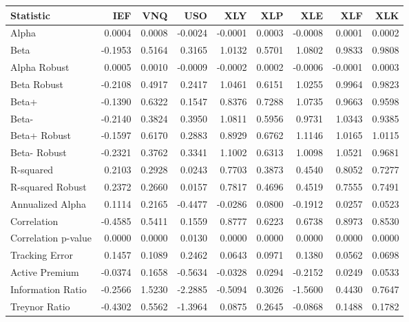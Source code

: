 \begin{tabular}{lrrrrrrrr}
\toprule
Statistic & IEF & VNQ & USO & XLY & XLP & XLE & XLF & XLK \\
\midrule
Alpha & 0.0004 & 0.0008 & -0.0024 & -0.0001 & 0.0003 & -0.0008 & 0.0001 & 0.0002 \\
Beta & -0.1953 & 0.5164 & 0.3165 & 1.0132 & 0.5701 & 1.0802 & 0.9833 & 0.9808 \\
Alpha Robust & 0.0005 & 0.0010 & -0.0009 & -0.0002 & 0.0002 & -0.0006 & -0.0001 & 0.0003 \\
Beta Robust & -0.2108 & 0.4917 & 0.2417 & 1.0461 & 0.6151 & 1.0255 & 0.9964 & 0.9823 \\
Beta+ & -0.1390 & 0.6322 & 0.1547 & 0.8376 & 0.7288 & 1.0735 & 0.9663 & 0.9598 \\
Beta- & -0.2140 & 0.3824 & 0.3950 & 1.0811 & 0.5956 & 0.9731 & 1.0343 & 0.9385 \\
Beta+ Robust & -0.1597 & 0.6170 & 0.2883 & 0.8929 & 0.6762 & 1.1146 & 1.0165 & 1.0115 \\
Beta- Robust & -0.2321 & 0.3762 & 0.3341 & 1.1002 & 0.6313 & 1.0098 & 1.0521 & 0.9681 \\
R-squared & 0.2103 & 0.2928 & 0.0243 & 0.7703 & 0.3873 & 0.4540 & 0.8052 & 0.7277 \\
R-squared Robust & 0.2372 & 0.2660 & 0.0157 & 0.7817 & 0.4696 & 0.4519 & 0.7555 & 0.7491 \\
Annualized Alpha & 0.1114 & 0.2165 & -0.4477 & -0.0286 & 0.0800 & -0.1912 & 0.0257 & 0.0523 \\
Correlation & -0.4585 & 0.5411 & 0.1559 & 0.8777 & 0.6223 & 0.6738 & 0.8973 & 0.8530 \\
Correlation p-value & 0.0000 & 0.0000 & 0.0130 & 0.0000 & 0.0000 & 0.0000 & 0.0000 & 0.0000 \\
Tracking Error & 0.1457 & 0.1089 & 0.2462 & 0.0643 & 0.0971 & 0.1380 & 0.0562 & 0.0698 \\
Active Premium & -0.0374 & 0.1658 & -0.5634 & -0.0328 & 0.0294 & -0.2152 & 0.0249 & 0.0533 \\
Information Ratio & -0.2566 & 1.5230 & -2.2885 & -0.5094 & 0.3026 & -1.5600 & 0.4430 & 0.7647 \\
Treynor Ratio & -0.4302 & 0.5562 & -1.3964 & 0.0875 & 0.2645 & -0.0868 & 0.1488 & 0.1782 \\
\bottomrule
\end{tabular}
